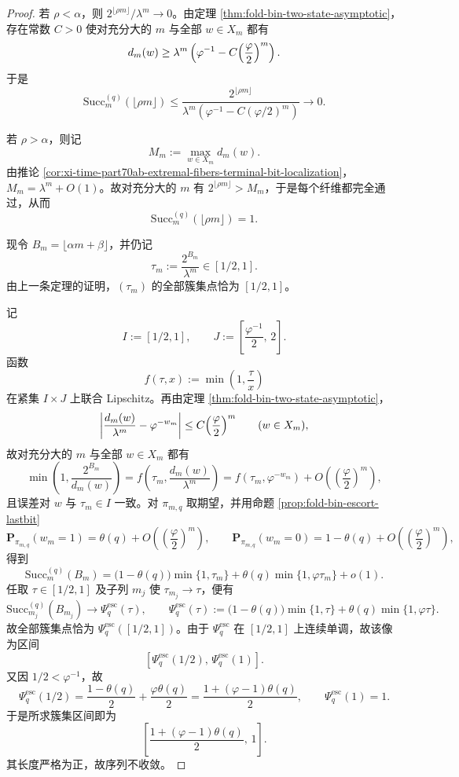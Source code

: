 \begin{proof}
若 \(\rho<\alpha\)，则 \(2^{\lfloor \rho m\rfloor}/\lambda^m\to 0\)。由定理 \ref{thm:fold-bin-two-state-asymptotic}，存在常数 \(C>0\) 使对充分大的 \(m\) 与全部 \(w\in X_m\) 都有
\[
d_m(w)\ge \lambda^m\left(\varphi^{-1}-C\Bigl(\frac{\varphi}{2}\Bigr)^m\right).
\]
于是
\[
\mathrm{Succ}_{m}^{(q)}(\lfloor \rho m\rfloor)
\le
\frac{2^{\lfloor \rho m\rfloor}}{\lambda^m\left(\varphi^{-1}-C(\varphi/2)^m\right)}
\longrightarrow 0.
\]

若 \(\rho>\alpha\)，则记
\[
M_m:=\max_{w\in X_m}d_m(w).
\]
由推论 \ref{cor:xi-time-part70ab-extremal-fibers-terminal-bit-localization}，\(M_m=\lambda^m+O(1)\)。故对充分大的 \(m\) 有 \(2^{\lfloor \rho m\rfloor}>M_m\)，于是每个纤维都完全通过，从而
\[
\mathrm{Succ}_{m}^{(q)}(\lfloor \rho m\rfloor)=1.
\]

现令 \(B_m=\lfloor \alpha m+\beta\rfloor\)，并仍记
\[
\tau_m:=\frac{2^{B_m}}{\lambda^m}\in[1/2,1].
\]
由上一条定理的证明，\((\tau_m)\) 的全部簇集点恰为 \([1/2,1]\)。

记
\[
I:=[1/2,1],
\qquad
J:=\left[\frac{\varphi^{-1}}{2},\,2\right].
\]
函数
\[
f(\tau,x):=\min\!\left(1,\frac{\tau}{x}\right)
\]
在紧集 \(I\times J\) 上联合 Lipschitz。再由定理 \ref{thm:fold-bin-two-state-asymptotic}，
\[
\left|\frac{d_m(w)}{\lambda^m}-\varphi^{-w_m}\right|
\le
C\Bigl(\frac{\varphi}{2}\Bigr)^m
\qquad (w\in X_m),
\]
故对充分大的 \(m\) 与全部 \(w\in X_m\) 都有
\[
\min\!\left(1,\frac{2^{B_m}}{d_m(w)}\right)
=
f\!\left(\tau_m,\frac{d_m(w)}{\lambda^m}\right)
=
f\!\left(\tau_m,\varphi^{-w_m}\right)
+O\!\left(\left(\frac{\varphi}{2}\right)^m\right),
\]
且误差对 \(w\) 与 \(\tau_m\in I\) 一致。对 \(\pi_{m,q}\) 取期望，并用命题 \ref{prop:fold-bin-escort-lastbit}
\[
\mathbf P_{\pi_{m,q}}(w_m=1)=\theta(q)+O\!\left(\left(\frac{\varphi}{2}\right)^m\right),
\qquad
\mathbf P_{\pi_{m,q}}(w_m=0)=1-\theta(q)+O\!\left(\left(\frac{\varphi}{2}\right)^m\right),
\]
得到
\[
\mathrm{Succ}_{m}^{(q)}(B_m)
=
\bigl(1-\theta(q)\bigr)\min\{1,\tau_m\}
+
\theta(q)\min\{1,\varphi\tau_m\}
+o(1).
\]
任取 \(\tau\in[1/2,1]\) 及子列 \(m_j\) 使 \(\tau_{m_j}\to\tau\)，便有
\[
\mathrm{Succ}_{m_j}^{(q)}(B_{m_j})
\longrightarrow
\Psi_q^{\mathrm{esc}}(\tau),
\qquad
\Psi_q^{\mathrm{esc}}(\tau)
:=
\bigl(1-\theta(q)\bigr)\min\{1,\tau\}
+
\theta(q)\min\{1,\varphi\tau\}.
\]
故全部簇集点恰为 \(\Psi_q^{\mathrm{esc}}([1/2,1])\)。由于 \(\Psi_q^{\mathrm{esc}}\) 在 \([1/2,1]\) 上连续单调，故该像为区间
\[
\left[\Psi_q^{\mathrm{esc}}(1/2),\,\Psi_q^{\mathrm{esc}}(1)\right].
\]
又因 \(1/2<\varphi^{-1}\)，故
\[
\Psi_q^{\mathrm{esc}}(1/2)
=
\frac{1-\theta(q)}{2}+\frac{\varphi\theta(q)}{2}
=
\frac{1+(\varphi-1)\theta(q)}{2},
\qquad
\Psi_q^{\mathrm{esc}}(1)=1.
\]
于是所求簇集区间即为
\[
\left[\frac{1+(\varphi-1)\theta(q)}{2},\,1\right].
\]
其长度严格为正，故序列不收敛。
\end{proof}

